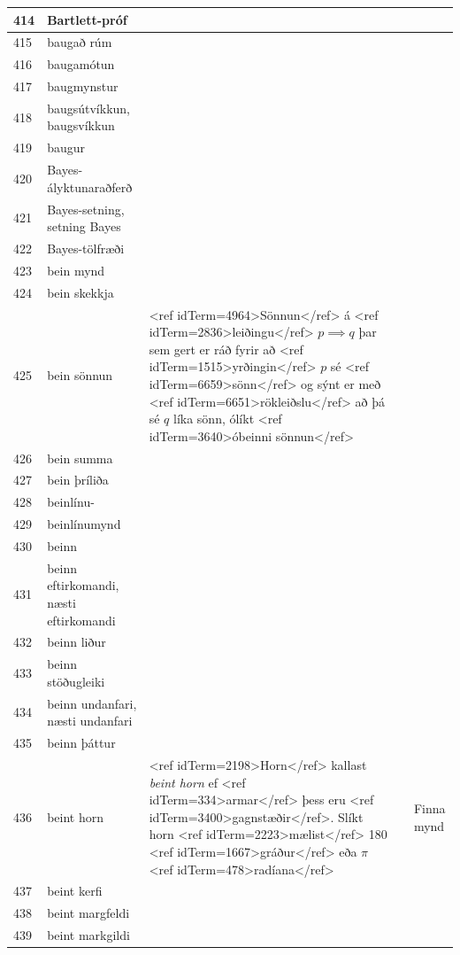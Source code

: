 \begin{longtable}{p{}|p{}|p{}|p{}|p{}}
\hline
414 & Bartlett-próf &  &  &  \\
\hline
415 & baugað rúm &  &  &  \\
\hline
416 & baugamótun &  &  &  \\
\hline
417 & baugmynstur &  &  &  \\
\hline
418 & baugsútvíkkun, baugsvíkkun &  &  &  \\
\hline
419 & baugur &  &  &  \\
\hline
420 & Bayes-ályktunaraðferð &  &  &  \\
\hline
421 & Bayes-setning, setning Bayes &  &  &  \\
\hline
422 & Bayes-tölfræði &  &  &  \\
\hline
423 & bein mynd &  &  &  \\
\hline
424 & bein skekkja &  &  &  \\
\hline
425 & bein sönnun & <ref idTerm=4964>Sönnun</ref> á <ref idTerm=2836>leiðingu</ref> $p \implies q$ þar sem gert er ráð fyrir að <ref idTerm=1515>yrðingin</ref> $p$ sé <ref idTerm=6659>sönn</ref> og sýnt er með <ref idTerm=6651>rökleiðslu</ref> að þá sé $q$ líka sönn, ólíkt <ref idTerm=3640>óbeinni sönnun</ref> & & \\
\hline
426 & bein summa &  &  &  \\
\hline
427 & bein þríliða &  &  &  \\
\hline
428 & beinlínu- &  &  &  \\
\hline
429 & beinlínumynd &  &  &  \\
\hline
430 & beinn &  &  &  \\
\hline
431 & beinn eftirkomandi, næsti eftirkomandi &  &  &  \\
\hline
432 & beinn liður &  &  &  \\
\hline
433 & beinn stöðugleiki &  &  &  \\
\hline
434 & beinn undanfari, næsti undanfari &  &  &  \\
\hline
435 & beinn þáttur &  &  &  \\
\hline
436 & beint horn & <ref idTerm=2198>Horn</ref> kallast \textit{beint horn} ef <ref idTerm=334>armar</ref> þess eru <ref idTerm=3400>gagnstæðir</ref>. Slíkt horn <ref idTerm=2223>mælist</ref> 180 <ref idTerm=1667>gráður</ref> eða $\pi$ <ref idTerm=478>radíana</ref> & & Finna mynd \\
\hline
437 & beint kerfi &  &  &  \\
\hline
438 & beint margfeldi &  &  &  \\
\hline
439 & beint markgildi &  &  &  \\

\end{longtable}
